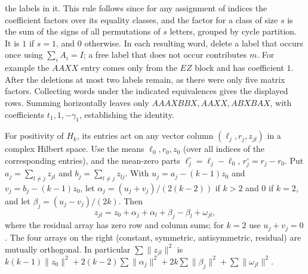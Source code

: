 \documentclass[11pt]{article}
\begin{document}
the labels in it. This rule follows since for any assignment of
indices the coefficient factors over its equality classes,
and the factor for a class of size \(s\) is the sum of the signs
of all permutations of \(s\) letters, grouped by cycle partition.
It is \(1\) if \(s=1\), and \(0\) otherwise. In each resulting word,
delete a label that occurs once using \(\sum_iA_i=I\);
a free label that does not occur contributes \(m\).
For example the \(AAXX\) entry comes only from the \(EZ\) block
and has coefficient \(1\). After the deletions at most two labels
remain, as there were only five matrix factors. Collecting words
under the indicated equivalences gives the displayed rows.
Summing horizontally leaves only \(AAAXBBX,AAXX,ABXBAX\),
with coefficients \(t_1,1,-\gamma_1\), establishing the identity.

For positivity of \(H_k\), its entries act on any vector column
\((\ell_j,r_j,z_{jl})\) in a complex Hilbert space. Use the means
\(\ell_0,r_0,z_0\) (over all indices of the corresponding entries),
and the mean-zero parts \(\ell_j^\circ=\ell_j-\ell_0\),
\(r_j^\circ=r_j-r_0\). Put \(a_j=\sum_{l\ne j}z_{jl}\) and
\(b_j=\sum_{l\ne j}z_{lj}\). With \(u_j=a_j-(k-1)z_0\) and
\(v_j=b_j-(k-1)z_0\), let \(\alpha_j=(u_j+v_j)/(2(k-2))\)
if \(k>2\) and \(0\) if \(k=2\), and let \(\beta_j=(u_j-v_j)/(2k)\).
Then
\[
z_{jl}=z_0+\alpha_j+\alpha_l+\beta_j-\beta_l+\omega_{jl},
\]
where the residual array has zero row and column sums; for \(k=2\)
use \(u_j+v_j=0\). The four arrays on the right (constant,
symmetric, antisymmetric, residual) are mutually orthogonal.
In particular \(\sum\|z_{jl}\|^2\) is
\(k(k-1)\|z_0\|^2+2(k-2)\sum\|\alpha_j\|^2+
2k\sum\|\beta_j\|^2+\sum\|\omega_{jl}\|^2\).
\end{document}
